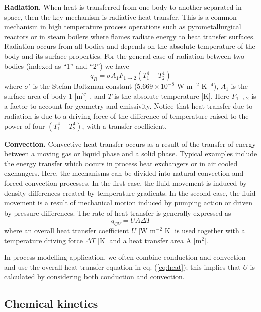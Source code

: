 \documentclass[a4paper,11pt]{article}
\theoremstyle{definition}
\begin{document}
\textbf{Radiation.} When heat is transferred from one body to another separated in space, then the key
mechanism is radiative heat transfer. This is a common mechanism in high temperature
process operations such as pyrometallurgical reactors or in steam boilers where flames
radiate energy to heat transfer surfaces. Radiation occurs from all bodies and depends
on the absolute temperature of the body and its surface properties.
For the general case of radiation between two bodies (indexed as ``1'' and ``2'') we have
\begin{equation}
	q_{R} = \sigma A_1 F_{1 \to 2} (T_1^4 - T_2^4)
\end{equation}
\noindent where $\sigma'$ is the Stefan-Boltzman constant ($5.669 \times 10^{-8} $ W m$^{-2}$ K$^{-4}$), 
$A_1$ is the surface area of body 1 [m$^2$] , and $T$ is the absolute temperature [K].
Here $F_{1 \to 2}$ is a factor to account for geometry and emissivity.
Notice that heat transfer due to radiation is due to a driving force of the difference of
temperature raised to the power of four $(T_1^4 - T_2^4)$, with a transfer coefficient.

\textbf{Convection.} Convective heat transfer occurs as a result of the transfer of energy between a moving
gas or liquid phase and a solid phase. Typical examples include the energy transfer
which occurs in process heat exchangers or in air cooled exchangers. Here, the mechanisms can be divided into natural convection and forced convection processes. In
the first case, the fluid movement is induced by density differences created by temperature gradients. In the second case, the fluid movement is a result of mechanical
motion induced by pumping action or driven by pressure differences. The rate of heat
transfer is generally expressed as
\begin{equation} \label{eq:heat}
	q_{CV} = U A \Delta T
\end{equation}
\noindent where an overall heat transfer coefficient $U$ [W m$^{-2}$ K] is used together 
with a temperature driving force $\Delta T$ [K] and a heat transfer area A [m$^2$]. 

In process modelling application, we often combine conduction and convection and use the overall
heat transfer equation in eq. (\ref{eq:heat}); this implies that $U$ is calculated by considering both conduction and convection.


\subsection{Chemical kinetics}
\end{document}
